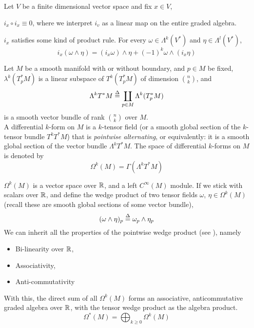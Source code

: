 \documentclass[../main-manifolds.tex]{subfiles}
\begin{document}
\begin{wts}
    Let $V$ be a finite dimensional vector space and fix $x\in V$,
    \begin{enumroman}
        \item $i_x\circ i_x\equiv 0$, where we interpret $i_v$ as a linear map on the entire graded algebra.
        \item $i_x$ satisfies some kind of product rule. For every $\omega\in \Lambda^k(V^*)$ and $\eta\in\Lambda^l(V^*)$,
        \[
            i_x(\omega\wedge\eta) = (i_x\omega)\wedge\eta + (-1)^{k}\omega\wedge(i_x\eta)
        \]
    \end{enumroman}
\end{wts}

    \begin{definition}
        Let $M$ be a smooth manifold with or without boundary, and $p\in M$ be fixed, $\lambda^k(T_p^*M)$ is a linear subspace of $T^k(T_p^*M)$ of dimension $\binom{n}{k}$, and
        \[
            \Lambda^kT^*M \overset{\Delta}{=} \coprod_{p\in M}\Lambda ^k(T^*_p M)
        \]
        is a smooth vector bundle of rank $\binom{n}{k}$ over $M$. \\

        A differential $k$-form on $M$ is a $k$-tensor field (or a smooth global section of the $k$-tensor bundle $T^kT^*M$) that is \emph{pointwise alternating}, or equivalently: it is a smooth global section of the vector bundle $\Lambda^kT^*M$. The space of differential $k$-forms on $M$ is denoted by 
        \[
            \Omega^k(M) = \Gamma(\Lambda^kT^*M)
        \]
    \end{definition}
    \begin{definition}
        $\Omega^k(M)$ is a vector space over $\mathbb{R}$, and a left $C^\infty(M)$ module. If we stick with scalars over $\mathbb{R}$, and define the wedge product of two tensor fields $\omega$, $\eta\in \Omega^k(M)$ (recall these are smooth global sections of some vector bundle),
        \[
            (\omega\wedge\eta)_p\overset{\Delta}{=} \omega_p\wedge\eta_p
        \]
        We can inherit all the properties of the pointwise wedge product (see ), namely \begin{itemize}
            \item Bi-linearity over $\mathbb{R}$,
            \item Associativity,
            \item Anti-commutativity
        \end{itemize}
        With this, the direct sum of all $\Omega^k(M)$ forms an associative, anticommutative graded algebra over $\mathbb{R}$, with the tensor wedge product as the algebra product.
        \[
            \Omega^*(M) = \bigoplus_{k\geq 0}\Omega^k(M)
        \]
    \end{definition}
    
\end{document}
